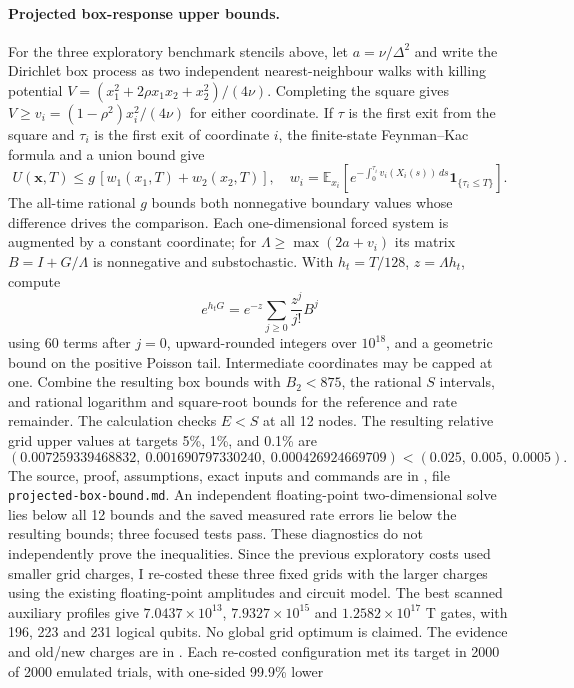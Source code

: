 \documentclass[11pt,a4paper]{article}
\newcommand{\x}{\mathbf x}
\begin{document}
\paragraph{Projected box-response upper bounds.}
For the three exploratory benchmark stencils above, let $a=\nu/\Delta^2$
and write the Dirichlet box process as two independent nearest-neighbour
walks with killing potential
$V=(x_1^2+2\rho x_1x_2+x_2^2)/(4\nu)$. Completing the square gives
$V\ge v_i=(1-\rho^2)x_i^2/(4\nu)$ for either coordinate. If $\tau$ is the
first exit from the square and $\tau_i$ is the first exit of coordinate $i$,
the finite-state Feynman--Kac formula and a union bound give
\[
 U(\x,T)\le g\,[w_1(x_1,T)+w_2(x_2,T)],\quad
 w_i=\mathbb E_{x_i}\!\left[e^{-\int_0^{\tau_i}v_i(X_i(s))\,ds}
 \mathbf1_{\{\tau_i\le T\}}\right].
\]
The all-time rational $g$ bounds both nonnegative boundary values whose
difference drives the comparison. Each one-dimensional forced system is
augmented by a constant coordinate; for $\Lambda\ge\max(2a+v_i)$ its matrix
$B=I+G/\Lambda$ is nonnegative and substochastic. With $h_t=T/128$,
$z=\Lambda h_t$, compute
\[
 e^{h_tG}=e^{-z}\sum_{j\ge0}\frac{z^j}{j!}B^j
\]
using 60 terms after $j=0$, upward-rounded integers over $10^{18}$, and a
geometric bound on the positive Poisson tail. Intermediate coordinates may
be capped at one. Combine the resulting box bounds with $B_2<875$, the
rational $S$ intervals, and rational logarithm and square-root bounds for the
reference and rate remainder. The calculation checks $E<S$ at all 12 nodes.
The resulting relative grid upper values at targets 5\%, 1\%, and 0.1\% are
\[
 (0.007259339468832,\ 0.001690797330240,\ 0.000426924669709)
 < (0.025,\ 0.005,\ 0.0005).
\]
The source, proof, assumptions, exact inputs and commands are in
, file \texttt{projected-box-bound.md}. An independent
floating-point two-dimensional solve lies below all 12 bounds and the saved
measured rate errors lie below the resulting bounds; three focused tests
pass. These diagnostics do not independently prove the inequalities. Since
the previous exploratory costs used smaller grid charges, I re-costed these
three fixed grids with the larger charges using the existing floating-point
amplitudes and circuit model. The best scanned auxiliary profiles give
$7.0437\times10^{13}$, $7.9327\times10^{15}$ and $1.2582\times10^{17}$
T gates, with 196, 223 and 231 logical qubits. No global grid optimum is
claimed. The evidence and old/new charges are in
. Each re-costed configuration
met its target in 2000 of 2000 emulated trials, with one-sided 99.9\% lower
\end{document}
